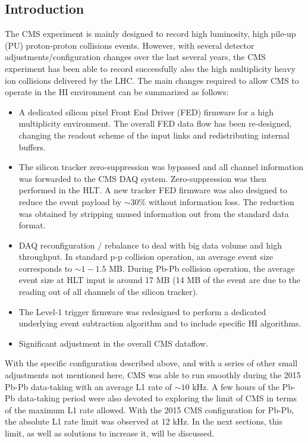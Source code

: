 \subsection{Introduction\label{subsec:HWintro}} 
The CMS experiment is mainly designed to record high luminosity, high pile-up (PU) proton-proton collisions events.
However, with several detector adjustments/configuration changes over the last several years, the CMS experiment has been able to record successfully also the high multiplicity heavy ion
collisions delivered by the LHC. The main changes required to allow CMS to
operate in the HI environment can be summarized as follows:

\begin{itemize} \item A dedicated silicon pixel Front End Driver (FED) firmware for a high multiplicity environment. The
overall FED data flow has been re-designed, changing the readout scheme of the input links and redistributing internal
buffers.

\item The silicon tracker zero-suppression was bypassed and all channel information was forwarded to the CMS DAQ system.
Zero-suppression was then performed in the HLT. A new tracker FED firmware was also designed to reduce the event payload
by $\sim 30 \%$ without information loss. The reduction was obtained by stripping unused information out from the
standard data format.

\item DAQ reconfiguration / rebalance to deal with big data volume and high throughput. In standard p-p collision
operation, an average event size corresponds to $\sim 1-1.5$ MB. During Pb-Pb collision operation, the average event
size at HLT input is around 17 MB (14 MB of the event are due to the reading out of all channels of the silicon tracker).  

\item The Level-1 trigger firmware was redesigned to perform a dedicated underlying event subtraction algorithm and to
include specific HI algorithms.

\item Significant adjustment in the overall CMS dataflow. \end{itemize}


With the specific configuration described above, and with a series of other small adjustments not mentioned here, CMS
was able to run smoothly during the 2015 Pb-Pb data-taking with an average L1 rate of $\sim 10$ kHz. A few hours of the
Pb-Pb data-taking period were also devoted to exploring the limit of CMS in terms of the maximum L1 rate allowed.  With
the 2015 CMS configuration for Pb-Pb, the absolute L1 rate limit was observed at 12 kHz. In the next sections, this
limit, as well as solutions to increase it, will be discussed.

